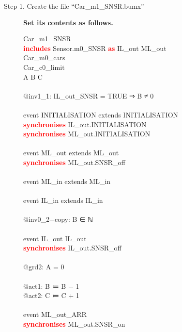 \begin{description}
	\item[Step 1. Create the file ``Car\_m1\_SNSR.bumx''] \textbf{Set its contents as follows.}
	
		\begin{center}
		\begin{Bcode}
			\ifplastex
			\Bmachine{} Car_m1_SNSR\\
			\textcolor{red}{\textbf{includes}} Sensor.m0_SNSR \textcolor{red}{\textbf{as}} IL_out ML_out\\
			\Brefines{} Car_m0_cars\\
			\Bsees{} Car_c0_limit\\
			\Bvariables{} A B C\\
			\Binvariants\\
			@inv1_1: IL_out_SNSR = TRUE ⇒ B ≠ 0\\
			\Bevents\\
			event INITIALISATION extends INITIALISATION\\
			\textcolor{red}{\textbf{synchronises}} IL_out.INITIALISATION\\
			\textcolor{red}{\textbf{synchronises}} ML_out.INITIALISATION\\
			\Bend\\
			event ML_out extends ML_out\\
			\textcolor{red}{\textbf{synchronises}} ML_out.SNSR_off\\
			\Bend\\
			event ML_in extends ML_in\\
			\Bend\\
			event IL_in extends IL_in\\
			\Bwhere\\
			\Btheorem{} @inv0_2−copy: B ∈ ℕ \\
			\Bend\\
			event IL_out \Brefines{} IL_out\\
			\textcolor{red}{\textbf{synchronises}} IL_out.SNSR_off\\
			\Bwhere\\
			@grd2: A = 0\\
			\Bthen\\
			@act1: B ≔ B − 1\\
			@act2: C ≔ C + 1\\
			\Bend\\
			event ML_out_ARR\\
			\textcolor{red}{\textbf{synchronises}} ML_out.SNSR_on\\
			\Bend\\

\end{Bcode}
\end{center}
\end{description}
